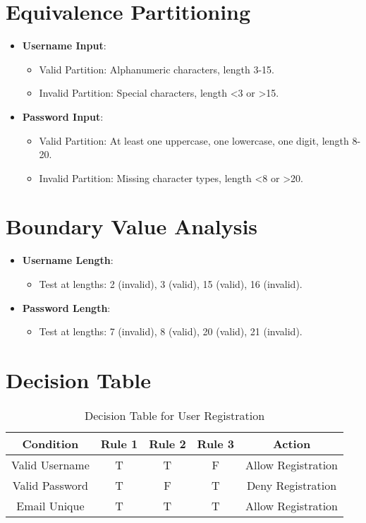\documentclass[12pt,a4paper]{report}
\begin{document}
\section{Equivalence Partitioning}
\begin{itemize}
    \item \textbf{Username Input}:
    \begin{itemize}
        \item Valid Partition: Alphanumeric characters, length 3-15.
        \item Invalid Partition: Special characters, length <3 or >15.
    \end{itemize}
    \item \textbf{Password Input}:
    \begin{itemize}
        \item Valid Partition: At least one uppercase, one lowercase, one digit, length 8-20.
        \item Invalid Partition: Missing character types, length <8 or >20.
    \end{itemize}
\end{itemize}

\section{Boundary Value Analysis}
\begin{itemize}
    \item \textbf{Username Length}:
    \begin{itemize}
        \item Test at lengths: 2 (invalid), 3 (valid), 15 (valid), 16 (invalid).
    \end{itemize}
    \item \textbf{Password Length}:
    \begin{itemize}
        \item Test at lengths: 7 (invalid), 8 (valid), 20 (valid), 21 (invalid).
    \end{itemize}
\end{itemize}

\section{Decision Table}
\begin{table}[H]
\centering
\begin{tabular}{cccc|c}
\toprule
\textbf{Condition} & \textbf{Rule 1} & \textbf{Rule 2} & \textbf{Rule 3} & \textbf{Action} \\
\midrule
Valid Username & T & T & F & Allow Registration \\
Valid Password & T & F & T & Deny Registration \\
Email Unique   & T & T & T & Allow Registration \\
\bottomrule
\end{tabular}
\caption{Decision Table for User Registration}
\end{table}
\end{document}
